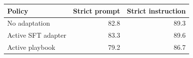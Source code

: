 \begin{tabular}{@{}lrr@{}}
\toprule
Policy & Strict prompt & Strict instruction \\
\midrule
No adaptation & 82.8 & 89.3 \\
Active SFT adapter & 83.3 & 89.6 \\
Active playbook & 79.2 & 86.7 \\
\bottomrule
\end{tabular}
